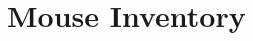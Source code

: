 \documentclass[11pt, english, twoside, a4paper]{book}
\begin{document}
%
%

\frontmatter %
	

\mainmatter %
    \chapter{Mouse Inventory}

%    
%    

\end{document}
